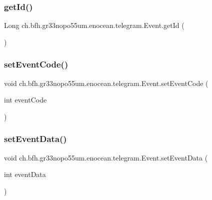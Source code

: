 \subsubsection{\texorpdfstring{get\+Id()}{getId()}}
{\footnotesize\ttfamily Long ch.\+bfh.\+gr33nopo55um.\+enocean.\+telegram.\+Event.\+get\+Id (\begin{DoxyParamCaption}{ }\end{DoxyParamCaption})}

\hypertarget{classch_1_1bfh_1_1gr33nopo55um_1_1enocean_1_1telegram_1_1_event_ae9266459daef3c1a73f1f17bc3180602}{}\label{classch_1_1bfh_1_1gr33nopo55um_1_1enocean_1_1telegram_1_1_event_ae9266459daef3c1a73f1f17bc3180602} 
\subsubsection{\texorpdfstring{set\+Event\+Code()}{setEventCode()}}
{\footnotesize\ttfamily void ch.\+bfh.\+gr33nopo55um.\+enocean.\+telegram.\+Event.\+set\+Event\+Code (\begin{DoxyParamCaption}\item[{int}]{event\+Code }\end{DoxyParamCaption})}

\hypertarget{classch_1_1bfh_1_1gr33nopo55um_1_1enocean_1_1telegram_1_1_event_a2999ad9b1f3f92b8896abdcb8ca72617}{}\label{classch_1_1bfh_1_1gr33nopo55um_1_1enocean_1_1telegram_1_1_event_a2999ad9b1f3f92b8896abdcb8ca72617} 
\subsubsection{\texorpdfstring{set\+Event\+Data()}{setEventData()}}
{\footnotesize\ttfamily void ch.\+bfh.\+gr33nopo55um.\+enocean.\+telegram.\+Event.\+set\+Event\+Data (\begin{DoxyParamCaption}\item[{int}]{event\+Data }\end{DoxyParamCaption})}


